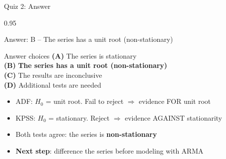 \documentclass[9pt, aspectratio=169, t]{beamer}
\begin{document}
\begin{frame}{Quiz 2: Answer}
    \begin{cminipage}{0.95\textwidth}
    \begin{exampleblock}{Answer: B -- The series has a unit root (non-stationary)}
    {\small
    \begin{block}{Answer choices}
        \textcolor{MainBlue}{\textbf{(A)}} The series is stationary \incorrect\\[3pt]
        \textcolor{MainBlue}{\textbf{(B)}} \textbf{\textcolor{Forest}{The series has a unit root (non-stationary)}} \correct\\[3pt]
        \textcolor{MainBlue}{\textbf{(C)}} The results are inconclusive \incorrect\\[3pt]
        \textcolor{MainBlue}{\textbf{(D)}} Additional tests are needed \incorrect
    \end{block}

        \vspace{0.1cm}

        \begin{itemize}
            \item ADF: $H_0$ = unit root. Fail to reject $\Rightarrow$ evidence FOR unit root
            \item KPSS: $H_0$ = stationary. Reject $\Rightarrow$ evidence AGAINST stationarity
            \item Both tests agree: the series is \textbf{non-stationary}
            \item \textbf{Next step}: difference the series before modeling with ARMA
        \end{itemize}
    }
    \end{exampleblock}

    \end{cminipage}
\end{frame}
\end{document}
